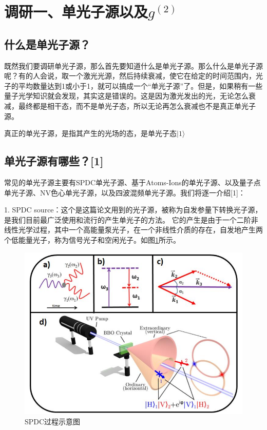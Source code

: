 \section{调研一、单光子源以及$g^{(2)}$}

\subsection{什么是单光子源？}

既然我们要调研单光子源，那么首先要知道什么是单光子源。那么什么是单光子源呢？有的人会说，取一个激光光源，然后持续衰减，使它在给定的时间范围内，光子的平均数量达到1或小于1，就可以搞成一个“单光子源”了。但是，如果稍有一些量子光学知识就会发现，其实这是错误的。这是因为激光发出的光，无论怎么衰减，最终都是相干态，而不是单光子态，所以无论再怎么衰减也不是真正单光子源。

真正的单光子源，是指其产生的光场的态，是单光子态$|1\rangle$

\subsection{单光子源有哪些？[1]}

常见的单光子源主要有SPDC单光子源、基于Atoms-Ions的单光子源、以及量子点单光子源、NV色心单光子源，以及四波混频单光子源。我们将逐一介绍[1]：

1.  SPDC source：这个是这篇论文用到的光子源，被称为自发参量下转换光子源，是我们目前最广泛使用和流行的产生单光子的方法。
它的产生是由于一个二阶非线性光学过程，其中一个高能量泵光子，在一个非线性介质的存在，自发地产生两个低能量光子，称为信号光子和空闲光子。如图\ref{fig:SPDC1}所示。

\begin{figure}[ht]
	\centering
	\includegraphics[scale=0.2]{pic/SPDC1}
	\caption{SPDC过程示意图}
	\label{fig:SPDC1}
\end{figure}

